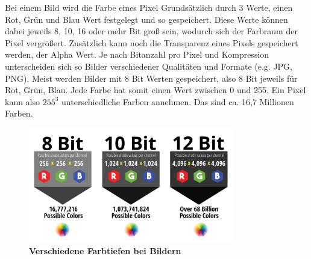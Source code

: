 Bei einem Bild wird die Farbe eines Pixel Grundsätzlich durch 3 Werte, einen Rot,
Grün und Blau Wert festgelegt und so gespeichert. Diese Werte können dabei jeweils
8, 10, 16 oder mehr Bit groß sein, wodurch sich der Farbraum der Pixel vergrößert.
Zusätzlich kann noch die Transparenz eines Pixels gespeichert werden, der Alpha Wert.
Je nach Bitanzahl pro Pixel und Kompression unterscheiden sich so Bilder verschiedener
Qualitäten und Formate (e.g. JPG, PNG). Meist werden Bilder mit 8 Bit Werten gespeichert,
also 8 Bit jeweils für Rot, Grün, Blau. Jede Farbe hat somit einen Wert zwischen 0 und 255.
Ein Pixel kann also $255^3$ unterschiedliche Farben annehmen. Das sind ca. 16,7 Millionen
Farben.

\begin{figure}[H]
    \centering
    \includegraphics[width=0.8\textwidth]{images/rgbvalues.png}
    \caption{\textbf{Verschiedene Farbtiefen bei Bildern}}
\end{figure}
